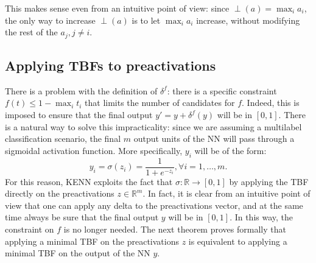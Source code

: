 This makes sense even from an intuitive point of view: since $\perp (a) = \max_ia_i$, the only way to increase $\perp(a)$ is to let $\max_{i} a_i$ increase, without modifying the rest of the $a_j, j \neq i$.

\subsection{Applying TBFs to preactivations} 
There is a problem with the definition of $\delta^f$: there is a specific constraint $f(t) \leq 1 - \max_i t_i$ that limits the number of candidates for $f$. Indeed, this is imposed to ensure that the final output $y'= y + \delta^f(y)$ will be in $\left[0,1\right]$. There is a natural way to solve this impracticality: since we are assuming a multilabel classification scenario, the final $m$ output units of the NN will pass through a sigmoidal activation function. More specifically, $y_i$ will be of the form:
\begin{equation*}
y_i = \sigma(z_i) = \frac{1}{1+e^{-z_i}}, \forall i=1,\dots,m.	
\end{equation*}
For this reason, KENN exploits the fact that $\sigma:\mathbb{R}\rightarrow\left[0,1\right]$ by applying the TBF directly on the preactivations $z\in \mathbb{R}^m$. In fact, it is clear from an intuitive point of view that one can apply any delta to the preactivations vector, and at the same time always be sure that the final output $y$ will be in $\left[0,1\right]$. In this way, the constraint on $f$ is no longer needed. The next theorem proves formally that applying a minimal TBF on the preactivations $z$ is equivalent to applying a minimal TBF on the output of the NN $y$.


